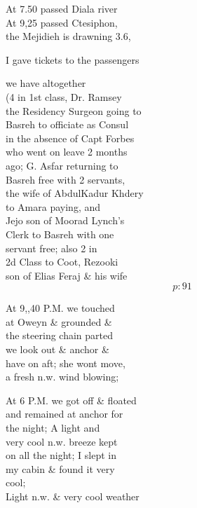 \documentclass{report}
\begin{document}
	\par{
 	At 7.50 passed Diala river\ \\At 9,25 passed Ctesiphon,\ \\the Mejidieh is drawning 3.6,\ \\
	}

	\par{
 	I gave tickets to the passengers\ \\
	}

	\par{
 	we have altogether\ \\(4 in 1st class, Dr. Ramsey\ \\the Residency Surgeon going to\ \\Basreh to officiate as Consul\ \\in the absence of Capt Forbes\ \\who went on leave 2 months\ \\ago; G. Asfar returning to\ \\Basreh free with 2 servants,\ \\the wife of AbdulKadur Khdery\ \\to Amara paying, and\ \\Jejo son of Moorad Lynch's\ \\Clerk to Basreh with one\ \\servant free; also 2 in\ \\2d Class to Coot, Rezooki\ \\son of Elias Feraj \& his wife\ \\
  \[p: 91 \]

	}


	\par{
 	At 9,,40 P.M. we touched\ \\at Oweyn \& grounded \&\ \\the steering chain parted\ \\we look out \& anchor \&\ \\have on aft; she wont move,\ \\a fresh n.w. wind blowing;\ \\
	}

	\par{
 	At 6 P.M. we got off \& floated\ \\and remained at anchor for\ \\the night; A light and\ \\very cool n.w. breeze kept\ \\on all the night; I slept in\ \\my cabin \& found it very\ \\cool;\ \\Light n.w. \& very cool weather\ \\
	}
\end{document}
